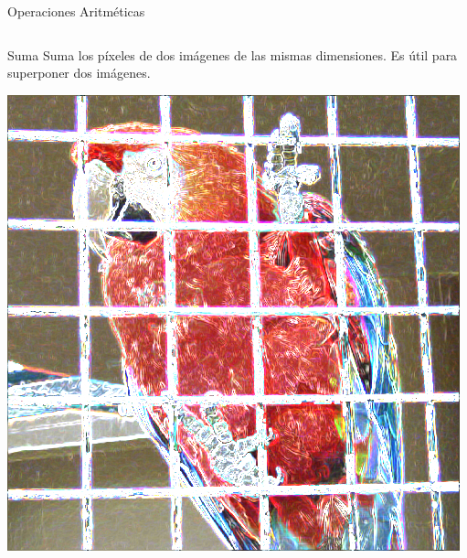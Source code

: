 \documentclass{beamer}
\begin{document}
\begin{frame}{Operaciones Aritméticas}
\begin{columns}

\column[t]{5.9cm}
\begin{center}
\begin{block}{Suma}
Suma los píxeles de dos imágenes de las mismas dimensiones. Es útil para superponer dos imágenes.
\end{block}
\vspace{0.5cm}
\includegraphics[scale=0.15]{./.Presentation/parrot_sum}
\end{center}


\end{columns}
\end{frame}
\end{document}
